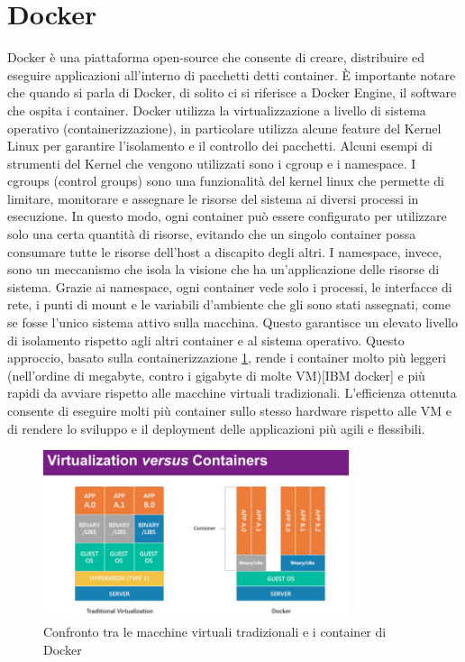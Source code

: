 \section{Docker}
\label{sec:docker}
Docker è una piattaforma open-source che consente di creare, distribuire ed eseguire applicazioni all'interno di pacchetti detti container. È importante notare che quando si parla di Docker, di solito ci si riferisce a Docker Engine, il software che ospita i container. Docker utilizza la virtualizzazione a livello di sistema operativo (containerizzazione), in particolare utilizza alcune feature del Kernel Linux per garantire l’isolamento e il controllo dei pacchetti. Alcuni esempi di strumenti del Kernel che vengono utilizzati sono i cgroup e i namespace. I cgroups (control groups) sono una funzionalità del kernel linux che permette di limitare, monitorare e assegnare le risorse del sistema ai diversi processi in esecuzione. In questo modo, ogni container può essere configurato per utilizzare solo una certa quantità di risorse, evitando che un singolo container possa consumare tutte le risorse dell’host a discapito degli altri.
I namespace, invece, sono un meccanismo che isola la visione che ha un’applicazione delle risorse di sistema. Grazie ai namespace, ogni container vede solo i processi, le interfacce di rete, i punti di mount e le variabili d’ambiente che gli sono stati assegnati, come se fosse l'unico sistema attivo sulla macchina. Questo garantisce un elevato livello di isolamento rispetto agli altri container e al sistema operativo. Questo approccio, basato sulla containerizzazione \ref{fig:docker_containerization}, rende i container molto più leggeri (nell’ordine di megabyte, contro i gigabyte di molte VM)[IBM docker] e più rapidi da avviare rispetto alle macchine virtuali tradizionali. L’efficienza ottenuta consente di eseguire molti più container sullo stesso hardware rispetto alle VM e di rendere lo sviluppo e il deployment delle applicazioni più agili e flessibili.

\begin{figure}[h]
    \centering
    \includegraphics[width=0.8\textwidth]{img/contvsvirt.png}
    \caption{Confronto tra le macchine virtuali tradizionali e i container di Docker}
    \label{fig:docker_containerization}
\end{figure}

